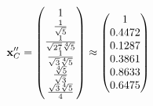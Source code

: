 \documentclass[10pt,a4paper]{article}
\begin{document}
	\[
		\bold{x}''_{C} = 
		\begin{pmatrix}
			{1} {} \\
			\frac{1} {\sqrt{5}} \\
			\frac{1} {\sqrt{27}\sqrt[4]{5}} \\
			\frac{1} {\sqrt{3}\sqrt[4]{5}} \\
			\frac{\sqrt[4]{5}} {\sqrt{3}} \\
			\frac{\sqrt{3}\sqrt[4]{5}} {{4}} \\
		\end{pmatrix}
		\approx
		\begin{pmatrix}
			1        \\
			0.4472   \\
			0.1287   \\
			0.3861   \\
			0.8633   \\
			0.6475   \\
		\end{pmatrix}
	\]
\end{document}

